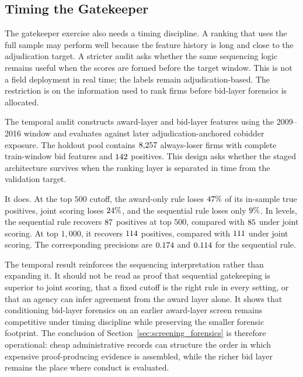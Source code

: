 \subsection{Timing the Gatekeeper}
\label{sec:temporal_gatekeeper}

The gatekeeper exercise also needs a timing discipline. A
ranking that uses the full sample may perform well because the
feature history is long and close to the adjudication target. A
stricter audit asks whether the same sequencing logic remains
useful when the scores are formed before the target window. This
is not a field deployment in real time; the labels remain
adjudication-based. The restriction is on the information used to
rank firms before bid-layer forensics is allocated.

The temporal audit constructs award-layer and bid-layer features
using the 2009--2016 window and evaluates against later
adjudication-anchored cobidder exposure. The holdout pool
contains $8{,}257$ always-loser firms with complete
train-window bid features and $142$ positives. This
design asks whether the staged architecture survives when the
ranking layer is separated in time from the validation target.

It does. At the top $500$ cutoff, the award-only rule loses
$47\%$ of its in-sample true positives, joint
scoring loses $24\%$, and the sequential rule
loses only $9\%$. In levels, the sequential rule
recovers $87$ positives at top $500$,
compared with $85$ under joint scoring.
At top $1{,}000$, it recovers $114$ positives,
compared with $111$ under joint scoring. The
corresponding precisions are $0.174$ and
$0.114$ for the sequential rule.

The temporal result reinforces the sequencing interpretation
rather than expanding it. It should not be read as proof that
sequential gatekeeping is superior to joint scoring, that a fixed
cutoff is the right rule in every setting, or that an agency can
infer agreement from the award layer alone. It shows that
conditioning bid-layer forensics on an earlier award-layer screen
remains competitive under timing discipline while preserving the
smaller forensic footprint. The conclusion of
Section~\ref{sec:screening_forensics} is therefore operational:
cheap administrative records can structure the order in which
expensive proof-producing evidence is assembled, while the richer
bid layer remains the place where conduct is evaluated.
